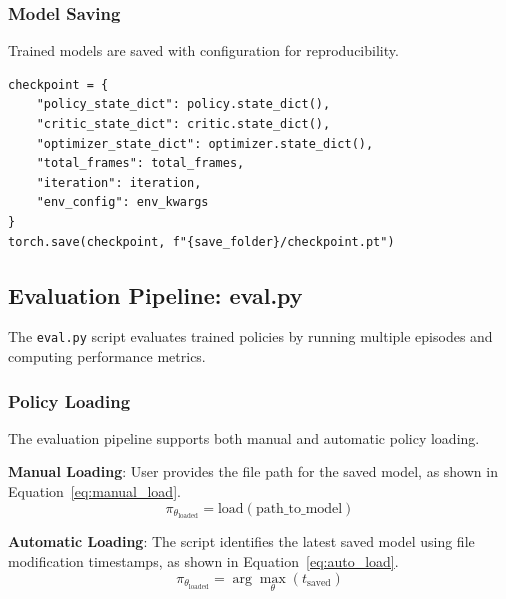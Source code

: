 \documentclass[11pt,a4paper]{article}
\begin{document}
\subsubsection{Model Saving}
\label{subsubsec:model_saving}

Trained models are saved with configuration for reproducibility.

\begin{lstlisting}[caption={Checkpoint saving.},label={lst:checkpoint}]
checkpoint = {
    "policy_state_dict": policy.state_dict(),
    "critic_state_dict": critic.state_dict(),
    "optimizer_state_dict": optimizer.state_dict(),
    "total_frames": total_frames,
    "iteration": iteration,
    "env_config": env_kwargs
}
torch.save(checkpoint, f"{save_folder}/checkpoint.pt")
\end{lstlisting}

\subsection{Evaluation Pipeline: eval.py}
\label{subsec:eval_pipeline}

The \texttt{eval.py} script evaluates trained policies by running multiple episodes and computing performance metrics.

\subsubsection{Policy Loading}
\label{subsubsec:policy_loading}

The evaluation pipeline supports both manual and automatic policy loading.

\textbf{Manual Loading}: User provides the file path for the saved model, as shown in Equation~\ref{eq:manual_load}.
\begin{equation}
\label{eq:manual_load}
\pi_{\theta_{\text{loaded}}} = \text{load}(\text{path\_to\_model})
\end{equation}

\textbf{Automatic Loading}: The script identifies the latest saved model using file modification timestamps, as shown in Equation~\ref{eq:auto_load}.
\begin{equation}
\label{eq:auto_load}
\pi_{\theta_{\text{loaded}}} = \arg\max_\theta(t_{\text{saved}})
\end{equation}
\end{document}
